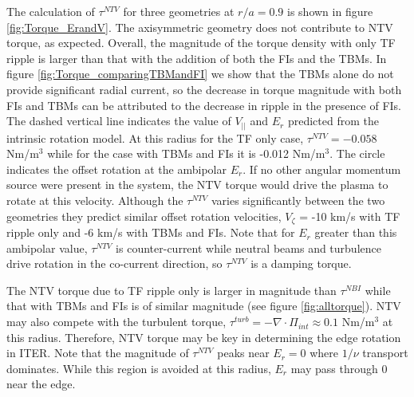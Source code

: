 \documentclass{article}
\numberwithin{figure}{section}
\numberwithin{equation}{section}
\begin{document}
The calculation of $\tau^{NTV}$ for three geometries at $r/a = 0.9$ is shown in figure \ref{fig:Torque_ErandV}. The axisymmetric geometry does not contribute to NTV torque, as expected. Overall, the magnitude of the torque density with only TF ripple is larger than that with the addition of both the FIs and the TBMs.  In figure \ref{fig:Torque_comparingTBMandFI} we show that the TBMs alone do not provide significant radial current, so the decrease in torque magnitude with both FIs and TBMs can be attributed to the decrease in ripple in the presence of FIs. The dashed vertical line indicates the value of $V_{||}$ and $E_r$ predicted from the intrinsic rotation model. At this radius for the TF only case, $\tau^{NTV} = -0.058$ Nm/m$^3$ while for the case with TBMs and FIs it is -0.012 Nm/m$^3$. The circle indicates the offset rotation at the ambipolar $E_r$. If no other angular momentum source were present in the system, the NTV torque would drive the plasma to rotate at this velocity. Although the $\tau^{NTV}$ varies significantly between the two geometries they predict similar offset rotation velocities, $V_{\zeta}$ = -10 km/s with TF ripple only and -6 km/s with TBMs and FIs. Note that for $E_r$ greater than this ambipolar value, $\tau^{NTV}$ is counter-current while neutral beams and turbulence drive rotation in the co-current direction, so $\tau^{NTV}$ is a damping torque. 

The NTV torque due to TF ripple only is larger in magnitude than $\tau^{NBI}$ while that with TBMs and FIs is of similar magnitude (see figure \ref{fig:alltorque}). NTV may also compete with the turbulent torque, $\tau^{turb} = - \nabla \cdot \Pi_{int} \approx 0.1$ Nm/m$^3$ at this radius. Therefore, NTV torque may be key in determining the edge rotation in ITER. Note that the magnitude of $\tau^{NTV}$ peaks near $E_r = 0$ where $1/\nu$ transport dominates. While this region is avoided at this radius, $E_r$ may pass through 0 near the edge. 

\FloatBarrier
\end{document}

